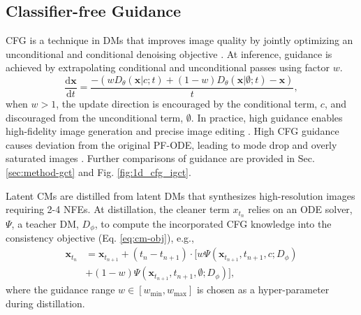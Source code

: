 \vspace{-0.15cm}
\subsection{Classifier-free Guidance}
\vspace{-0.15cm}

CFG is a technique in DMs that improves image quality by jointly optimizing an unconditional and conditional denoising objective \cite{ho2022classifier}. At inference, guidance is achieved by extrapolating conditional and unconditional passes using factor \(w\).
\begin{equation}
\frac{\text{d}\boldsymbol{x}}{\text{d}t} = \frac{-\left(w D_{\theta}(\boldsymbol{x}|c;t) + (1-w)D_{\theta}(\boldsymbol{x}|\emptyset;t) - \boldsymbol{x}\right)}{t},
\end{equation}
when \(w>1\), the update direction is encouraged by the conditional term, \(c\), and discouraged from the unconditional term, \(\emptyset\). In practice, high guidance enables high-fidelity image generation \cite{rombach2022high,podell2023sdxlimprovinglatentdiffusion,dieleman2022guidance,ho2022imagenvideohighdefinition,Meng_2023_CVPR} and precise image editing \cite{mokady2023null,miyake2023negative,han2024proxedit,garibi2024renoise,huberman2024edit,starodubcev2024invertible}. High CFG guidance causes deviation from the original PF-ODE, leading to mode drop and overly saturated images \cite{saharia2022photorealistictexttoimagediffusionmodels,kynkäänniemi2024applyingguidancelimitedinterval,bradley2024classifierfreeguidancepredictorcorrector}. Further comparisons of guidance are provided in Sec. \ref{sec:method-gct} and Fig. \ref{fig:1d_cfg_igct}.

Latent CMs \cite{luo2023latent} are distilled from latent DMs that synthesizes high-resolution images requiring 2-4 NFEs. At distillation, the cleaner term \(x_{t_n}\) relies on an ODE solver, \(\Psi\), a teacher DM, \(D_{\phi}\), to compute the incorporated CFG knowledge into the consistency objective (Eq. \ref{eq:cm-obj}), e.g.,
\vspace{-0.6em}
\begin{equation}
    \begin{aligned}
    \boldsymbol{x}_{t_n} &= \boldsymbol{x}_{t_{n+1}} + (t_n - t_{n+1}) \cdot [w\Psi(\boldsymbol{x}_{t_{n+1}}, t_{n+1}, c; D_{\phi}) \\
    & + (1-w) \Psi(\boldsymbol{x}_{t_{n+1}}, t_{n+1}, \emptyset; D_{\phi}) ],
    \end{aligned}
\label{eq:lcm}
\end{equation}
where the guidance range \(w \in [w_\text{min},w_\text{max}]\) is chosen as a hyper-parameter during distillation. 
\vspace{-0.15cm}
